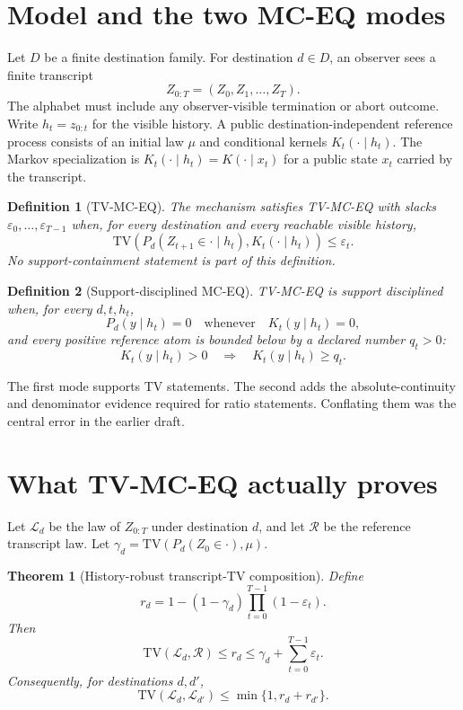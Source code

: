 \documentclass[11pt]{article}
\newtheorem{definition}{Definition}
\newtheorem{theorem}{Theorem}
\newcommand{\TV}{\mathrm{TV}}
\begin{document}
\section{Model and the two MC-EQ modes}
Let $D$ be a finite destination family.  For destination $d\in D$, an observer sees a finite transcript
\[
Z_{0:T}=(Z_0,Z_1,\ldots,Z_T).
\]
The alphabet must include any observer-visible termination or abort outcome.  Write $h_t=z_{0:t}$ for the visible history.  A public destination-independent reference process consists of an initial law $\mu$ and conditional kernels $K_t(\cdot\mid h_t)$.  The Markov specialization is $K_t(\cdot\mid h_t)=K(\cdot\mid x_t)$ for a public state $x_t$ carried by the transcript.

\begin{definition}[TV-MC-EQ]
The mechanism satisfies TV-MC-EQ with slacks $\varepsilon_0,\ldots,\varepsilon_{T-1}$ when, for every destination and every reachable visible history,
\[
\TV\!\left(P_d(Z_{t+1}\in\cdot\mid h_t),K_t(\cdot\mid h_t)\right)\le \varepsilon_t.
\]
No support-containment statement is part of this definition.
\end{definition}

\begin{definition}[Support-disciplined MC-EQ]
TV-MC-EQ is \emph{support disciplined} when, for every $d,t,h_t$,
\[
P_d(y\mid h_t)=0\quad\text{whenever}\quad K_t(y\mid h_t)=0,
\]
and every positive reference atom is bounded below by a declared number $q_t>0$:
\[
K_t(y\mid h_t)>0\quad\Longrightarrow\quad K_t(y\mid h_t)\ge q_t.
\]
\end{definition}

The first mode supports TV statements.  The second adds the absolute-continuity and denominator evidence required for ratio statements.  Conflating them was the central error in the earlier draft.

\section{What TV-MC-EQ actually proves}
Let $\mathcal L_d$ be the law of $Z_{0:T}$ under destination $d$, and let $\mathcal R$ be the reference transcript law.  Let $\gamma_d=\TV(P_d(Z_0\in\cdot),\mu)$.

\begin{theorem}[History-robust transcript-TV composition]
Define
\[
r_d=1-(1-\gamma_d)\prod_{t=0}^{T-1}(1-\varepsilon_t).
\]
Then
\[
\TV(\mathcal L_d,\mathcal R)\le r_d
\le \gamma_d+\sum_{t=0}^{T-1}\varepsilon_t.
\]
Consequently, for destinations $d,d'$,
\[
\TV(\mathcal L_d,\mathcal L_{d'})
\le \min\{1,r_d+r_{d'}\}.
\]
\end{theorem}
\end{document}
